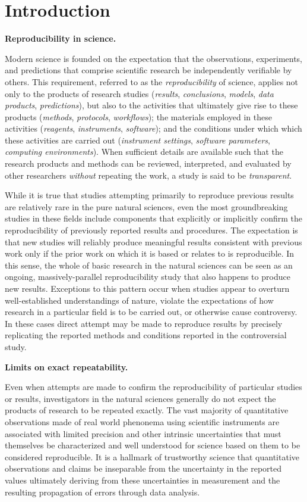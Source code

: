 \section{Introduction}

\textbf{Reproducibility in science.}

Modern science is founded on the expectation that the observations, experiments, and
	predictions that comprise scientific research be independently verifiable by others.
This requirement, referred to as the \emph{reproducibility} of 
	science, applies not only to the products of research studies (\emph{results}, 
	\emph{conclusions}, \emph{models}, \emph{data products}, \emph{predictions}), but also to the 
	activities that ultimately give rise to these products (\emph{methods}, 
	\emph{protocols}, \emph{workflows}); the materials employed in these 
 	activities (\emph{reagents}, \emph{instruments}, \emph{software}); and the conditions 
	under which which these activities are carried out (\emph{instrument settings}, 
	\emph{software parameters},
	\emph{computing environments}).  When sufficient details are available
	such that the research products and methods can be reviewed, interpreted, and
	evaluated by other researchers \emph{without} repeating the work, a study is said to be 
	\emph{transparent}.

While it is true that studies attempting primarily to reproduce previous results are relatively rare in the
	pure natural sciences, even the most groundbreaking studies in these fields include components	
	that explicitly or implicitly confirm the reproducibility of previously reported results and procedures.
The expectation is that new studies will reliably produce meaningful results consistent with previous work 
	only if the prior work on which it is based or relates to is reproducible.
In this sense, the whole of basic research in the natural sciences can be seen as an ongoing, massively-parallel
	reproducibility study that also happens to produce new results.
Exceptions to this pattern occur when studies appear to overturn well-established understandings of nature,
	violate the expectations of how research in a particular field is to be carried out, or otherwise cause controversy.
In these cases direct attempt may be made to reproduce results by precisely replicating the reported methods
	and conditions reported in the controversial study.


\textbf{Limits on exact repeatability.}

Even when attempts are made to confirm the reproducibility of particular studies or results, investigators in
	the natural sciences generally do not expect the products of research to be repeated exactly.
The vast majority of quantitative observations made of real world phenonema using scientific instruments
	are associated with limited precision and other intrinsic uncertainties that must themselves be characterized
	and well understood for science based on them to be considered reproducible.
It is a hallmark of trustworthy science that quantitative observations and claims be inseparable from the uncertainty
	in the reported values ultimately deriving from these uncertainties in measurement and the resulting
	propagation of errors through data analysis.

